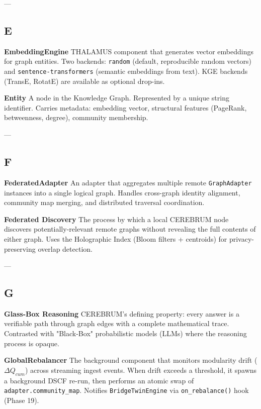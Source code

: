 \documentclass[11pt,article,oneside]{memoir}
\begin{document}
---

\subsection{E}

\textbf{EmbeddingEngine}
THALAMUS component that generates vector embeddings for graph entities. Two backends: \texttt{random} (default, repro\-ducible random vectors) and \texttt{sentence-transformers} (semantic embeddings from text). KGE backends (TransE, RotatE) are available as optional drop-ins.

\textbf{Entity}
A node in the Knowledge Graph. Represented by a unique string identifier. Carries metadata: embedding vector, structural features (PageRank, betweenness, degree), community membership.

---

\subsection{F}

\textbf{FederatedAdapter}
An adapter that aggregates multiple remote \texttt{GraphAdapter} instances into a single logical graph. Handles cross-graph identity alignment, community map merging, and distributed traversal coord\-ination.

\textbf{Federated Discovery}
The process by which a local CEREBRUM node discovers potentially-relevant remote graphs without revealing the full contents of either graph. Uses the Holographic Index (Bloom filters + centroids) for privacy-preserving overlap detection.

---

\subsection{G}

\textbf{Glass-Box Reasoning}
CEREBRUM's defining property: every answer is a verifiable path through graph edges with a complete mathe\-matical trace. Contrasted with "Black-Box" proba\-bilistic models (LLMs) where the reasoning process is opaque.

\textbf{GlobalRebalancer}
The background component that monitors modularity drift ($\Delta Q_{cum}$) across streaming ingest events. When drift exceeds a threshold, it spawns a background DSCF re-run, then performs an atomic swap of \texttt{adapter.community\_map}. Notifies \texttt{BridgeTwinEngine} via \texttt{on\_rebalance()} hook (Phase 19).
\end{document}

